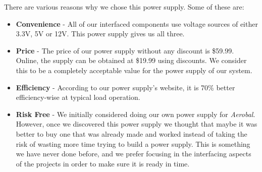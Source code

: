 		There are various reasons why we chose this power supply. Some of these are: 

		\begin{itemize}
		  \item \textbf{Convenience} - All of our interfaced components use voltage sources of either 3.3V, 5V or 12V. This power supply gives us all three. 
		  \item \textbf{Price} - The price of our power supply without any discount is \$59.99. Online, the supply can be obtained at \$19.99 using discounts. We consider this to be a completely acceptable value for the power supply of our system. 
		  \item \textbf{Efficiency} - According to our power supply's website, it is 70\% better efficiency-wise at typical load operation.
		  \item \textbf{Risk Free} - We initially considered doing our own power supply for \textit{Aerobal}. However, once we discovered this power supply we thought that maybe it was better to buy one that was already made and worked instead of taking the risk of wasting more time trying to build a power supply. This is something we have never done before, and we prefer focusing in the interfacing aspects of the projects in order to make sure it is ready in time.

		\end{itemize} 

\newpage